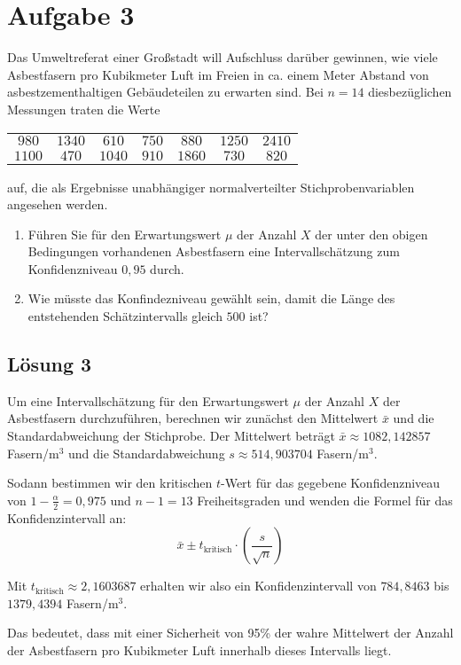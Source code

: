 \documentclass[main.tex]{subfiles}
\begin{document}
\section{Aufgabe 3}
Das Umweltreferat einer Großstadt will Aufschluss darüber gewinnen, wie viele Asbestfasern pro Kubikmeter Luft im Freien in ca. einem Meter Abstand von asbestzementhaltigen Gebäudeteilen zu erwarten sind. Bei $n=14$ diesbezüglichen Messungen traten die Werte
\begin{center}
\begin{tabular}{*{7}{c}}
$980$ & $1340$ & $610$ & $750$ & $880$ & $1250$ & $2410$ \\
$1100$ & $470$ & $1040$ & $910$ & $1860$ & $730$ & $820$
\end{tabular}
\end{center}
auf, die als Ergebnisse unabhängiger normalverteilter Stichprobenvariablen angesehen werden.
\begin{enumerate}
\item Führen Sie für den Erwartungswert $\mu$ der Anzahl $X$ der unter den obigen Bedingungen vorhandenen Asbestfasern eine Intervallschätzung zum Konfidenzniveau $0,95$ durch.
\item Wie müsste das Konfindezniveau gewählt sein, damit die Länge des entstehenden Schätzintervalls gleich $500$ ist?
\end{enumerate}

\subsection{Lösung 3}

Um eine Intervallschätzung für den Erwartungswert $\mu$ der Anzahl $X$ der Asbestfasern durchzuführen, berechnen wir zunächst den Mittelwert $\bar{x}$ und die Standardabweichung der Stichprobe.
Der Mittelwert beträgt $\bar{x} \approx 1082,142857$ Fasern/m$^3$ und die Standardabweichung $s \approx 514,903704$ Fasern/m$^3$.

Sodann bestimmen wir den kritischen $t$-Wert für das gegebene Konfidenzniveau von $1-\frac{\alpha}{2} = 0,975$ und $n-1 = 13$ Freiheitsgraden und wenden die Formel für das Konfidenzintervall an:
$$
   \bar{x} \pm t_{\text{kritisch}} \cdot \left( \frac{s}{\sqrt{n}} \right)
$$

Mit $t_{\text{kritisch}} \approx 2,1603687$ erhalten wir also ein Konfidenzintervall von $784,8463$ bis $1379,4394$ Fasern/m$^3$.

Das bedeutet, dass mit einer Sicherheit von 95\% der wahre Mittelwert der Anzahl der Asbestfasern pro Kubikmeter Luft innerhalb dieses Intervalls liegt.
\end{document}

